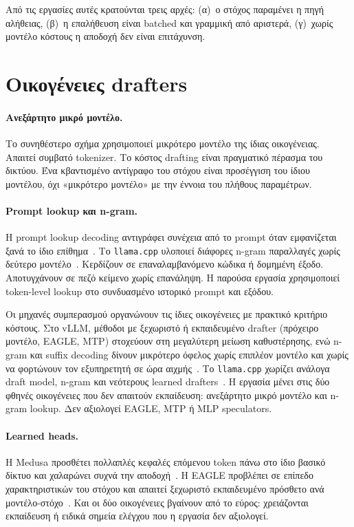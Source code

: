 \documentclass[a4paper,12pt]{report}
\theoremstyle{plain}
\theoremstyle{definition}
\theoremstyle{remark}
\begin{document}
Από τις εργασίες αυτές κρατούνται τρεις αρχές: (α)~ο στόχος παραμένει η πηγή
αλήθειας, (β)~η επαλήθευση είναι batched και γραμμική από αριστερά, (γ)~χωρίς
μοντέλο κόστους η αποδοχή δεν είναι επιτάχυνση.

\section{Οικογένειες drafters}

\paragraph{Ανεξάρτητο μικρό μοντέλο.}
Το συνηθέστερο σχήμα χρησιμοποιεί μικρότερο μοντέλο της ίδιας οικογένειας.
Απαιτεί συμβατό tokenizer. Το κόστος drafting είναι πραγματικό πέρασμα του
δικτύου.
Ένα κβαντισμένο αντίγραφο του στόχου είναι προσέγγιση του ίδιου μοντέλου, όχι
«μικρότερο μοντέλο» με την έννοια του πλήθους παραμέτρων.

\paragraph{Prompt lookup και n-gram.}
Η prompt lookup decoding αντιγράφει συνέχεια από το prompt όταν εμφανίζεται
ξανά το ίδιο επίθημα~\cite{saxena2023prompt}. Το \texttt{llama.cpp}
υλοποιεί διάφορες n-gram παραλλαγές χωρίς δεύτερο
μοντέλο~\cite{llamacpp-speculative}. Κερδίζουν σε επαναλαμβανόμενο κώδικα ή
δομημένη έξοδο. Αποτυγχάνουν σε πεζό κείμενο χωρίς επανάληψη. Η παρούσα
εργασία χρησιμοποιεί token-level lookup στο συνδυασμένο ιστορικό prompt και
εξόδου.

Οι μηχανές συμπερασμού οργανώνουν τις ίδιες οικογένειες με πρακτικό κριτήριο
κόστους. Στο vLLM, μέθοδοι με ξεχωριστό ή εκπαιδευμένο drafter (πρόχειρο
μοντέλο, EAGLE, MTP) στοχεύουν στη μεγαλύτερη μείωση καθυστέρησης, ενώ n-gram
και suffix decoding δίνουν μικρότερο όφελος χωρίς επιπλέον μοντέλο και χωρίς
να φορτώνουν τον εξυπηρετητή σε ώρα αιχμής~\cite{vllm-speculative-docs}. Το
\texttt{llama.cpp} χωρίζει ανάλογα draft model, n-gram και νεότερους learned
drafters~\cite{llamacpp-speculative}. Η εργασία μένει στις δύο φθηνές
οικογένειες που δεν απαιτούν εκπαίδευση: ανεξάρτητο μικρό μοντέλο και n-gram
lookup.
Δεν αξιολογεί EAGLE, MTP ή MLP speculators.

\paragraph{Learned heads.}
Η Medusa προσθέτει πολλαπλές κεφαλές επόμενου token πάνω στο ίδιο βασικό δίκτυο
και χαλαρώνει συχνά την αποδοχή~\cite{cai2024medusa}. Η EAGLE προβλέπει σε
επίπεδο χαρακτηριστικών του στόχου και απαιτεί ξεχωριστό εκπαιδευμένο πρόσθετο
ανά μοντέλο-στόχο~\cite{li2024eagle}. Και οι δύο οικογένειες βγαίνουν
από το εύρος: χρειάζονται εκπαίδευση ή ειδικά σημεία ελέγχου που η εργασία
δεν αξιολογεί.
\end{document}
